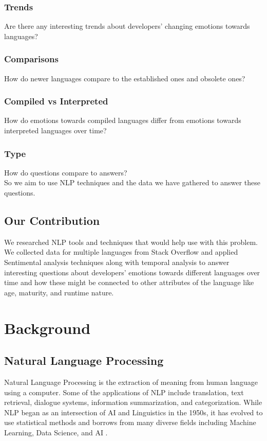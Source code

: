 \documentclass[conference]{IEEEtran}
\begin{document}
 \subsubsection{Trends}Are there any interesting trends about developers' changing emotions towards languages?
 \subsubsection{Comparisons}How do newer languages compare to the established ones and obsolete ones?
 \subsubsection{Compiled vs Interpreted}How do emotions towards compiled languages differ from emotions towards interpreted languages over time?
 \subsubsection{Type}How do questions compare to answers?\\

So we aim to use NLP techniques and the data we have gathered to answer these questions.

\subsection{Our Contribution}
We researched NLP tools and techniques that would help use with this problem. We collected data for multiple languages from Stack Overflow and applied Sentimental analysis techniques along with temporal analysis to answer interesting questions about developers' emotions towards different languages over time and how these might be connected to other attributes of the language like age, maturity, and runtime nature.\\

\section{Background}

\subsection{Natural Language Processing}
Natural Language Processing is the extraction of meaning from human language using a computer\cite{b7, b8}. Some of the applications of NLP include translation, text retrieval, dialogue systems, information summarization, and categorization\cite{b7}. While NLP began as an intersection of AI and Linguistics in the 1950s, it has evolved to use statistical methods and borrows from many diverse fields including Machine Learning, Data Science, and AI \cite{b8}. \\
\end{document}
